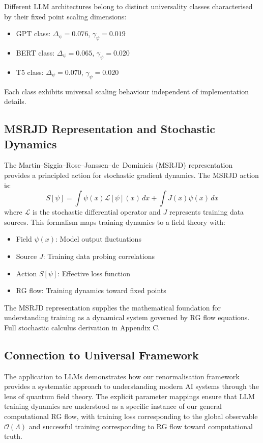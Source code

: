 \begin{theorem}
\label{thm:universality_classes_training}
Different LLM architectures belong to distinct universality classes characterised by their fixed point scaling dimensions:
\begin{itemize}
\item GPT class: $\Delta_\psi = 0.076$, $\gamma_\psi = 0.019$
\item BERT class: $\Delta_\psi = 0.065$, $\gamma_\psi = 0.020$
\item T5 class: $\Delta_\psi = 0.070$, $\gamma_\psi = 0.020$
\end{itemize}
Each class exhibits universal scaling behaviour independent of implementation details.
\end{theorem}

\subsection{MSRJD Representation and Stochastic Dynamics}

The Martin--Siggia--Rose--Janssen--de~Dominicis (MSRJD) representation \cite{martin1973,janssen1976,dedominicis1976} provides a principled action for stochastic gradient dynamics. The MSRJD action is:
\[
S[\psi] = \int \psi(x) \mathcal{L}[\psi](x) \, dx + \int J(x)\psi(x) \, dx
\]
where $\mathcal{L}$ is the stochastic differential operator and $J$ represents training data sources. This formalism maps training dynamics to a field theory with:

\begin{itemize}
\item Field $\psi(x)$: Model output fluctuations
\item Source $J$: Training data probing correlations
\item Action $S[\psi]$: Effective loss function
\item RG flow: Training dynamics toward fixed points
\end{itemize}

The MSRJD representation supplies the mathematical foundation for understanding training as a dynamical system governed by RG flow equations. Full stochastic calculus derivation in Appendix C.

\subsection{Connection to Universal Framework}

The application to LLMs demonstrates how our renormalisation framework provides a systematic approach to understanding modern AI systems through the lens of quantum field theory. The explicit parameter mappings ensure that LLM training dynamics are understood as a specific instance of our general computational RG flow, with training loss corresponding to the global observable $\mathcal{O}(\Lambda)$ and successful training corresponding to RG flow toward computational truth.

